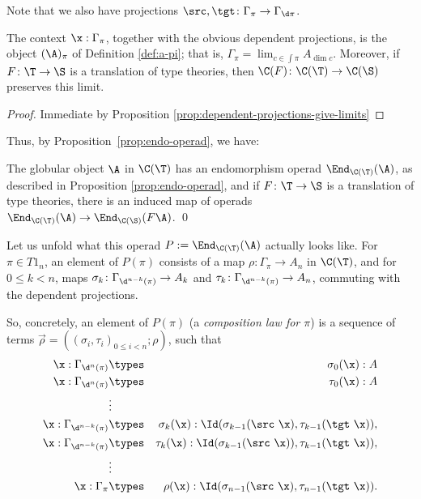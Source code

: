 Note that we also have projections $\src,\tgt \colon \Gamma_\pi \to \Gamma_{\d \pi}$.

\begin{lem}The context $\x: \Gamma_\pi$, together with the obvious dependent projections, is the object $(\A)_\pi$ of Definition \ref{def:a-pi}; that is, $\Gamma_\pi = \lim_{c \in \int \pi} A_{\dim c}$.  Moreover, if $F \colon \T \to \S$ is a translation of type theories, then $\C(F) \colon \C(\T) \to \C(\S)$ preserves this limit.
\end{lem}
\begin{proof}
Immediate by Proposition \ref{prop:dependent-projections-give-limits} 
\end{proof}

Thus, by Proposition~\ref{prop:endo-operad}, we have:
\begin{thm}The globular object $\A$ in $\C(\T)$ has an endomorphism operad $\End_{\C(\T)}(\A)$, as described in Proposition \ref{prop:endo-operad}, and if $F \colon \T \to \S$ is a translation of type theories, there is an induced map of operads $\End_{\C(\T)}(\A) \to \End_{\C(\S)}(F\A)$. \qed
\end{thm}

Let us unfold what this operad $P := \End_{\C(\T)}(\A)$ actually looks like.  For $\pi \in T1_n$, an element of $P(\pi)$ consists of a map $\rho \colon \Gamma_\pi\to A_n$ in $\C(\T)$, and for $0 \leq k < n$, maps $\sigma_k \colon \Gamma_{\d^{n-k}(\pi)} \to A_k$ and $\tau_k \colon \Gamma_{\d^{n-k}(\pi)} \to A_n$, commuting with the dependent projections.

So, concretely, an element of $P(\pi)$ (a \emph{composition law for $\pi$}) is a sequence of terms $\vec \rho = ((\sigma_i, \tau_i)_{0 \leq i < n}; \rho)$, such that
\begin{eqnarray*}
\x : \Gamma_{\d^n(\pi)} & \types & \sigma_0(\x) : A \\
\x : \Gamma_{\d^n(\pi)} & \types & \tau_0(\x) : A \\
& \vdots & \\
\x : \Gamma_{\d^{n-k}(\pi)} & \types & \sigma_k(\x): \Id (\sigma_{k-1}(\src\ \x),\tau_{k-1}(\tgt\ \x)),\\
\x : \Gamma_{\d^{n-k}(\pi)} & \types & \tau_k(\x): \Id (\sigma_{k-1}(\src\ \x)),\tau_{k-1}(\tgt\ \x)),\\
& \vdots & \\
\x : \Gamma_\pi & \types & \rho(\x) : \Id(\sigma_{n-1}(\src\ \x),\tau_{n-1}(\tgt\ \x)).
\end{eqnarray*} 

